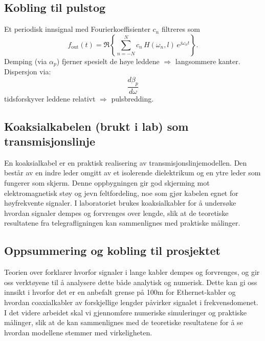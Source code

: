 \subsection{Kobling til pulstog}
Et periodisk innsignal med Fourierkoeffisienter \(c_n\) filtreres som
\[
f_{\text{out}}(t)=\Re\!\left\{\sum_{n=-N}^{N} c_n\,H(\omega_n,l)\,e^{j\omega_n t}\right\}.
\]
Demping (via \(\alpha_p\)) fjerner spesielt de høye leddene \(\Rightarrow\) langsommere kanter.\\
Dispersjon via: 
\[\frac{d\beta_p}{d\omega}\] 
tidsforskyver leddene relativt \(\Rightarrow\) pulsbredding.

\subsection{Koaksialkabelen (brukt i lab) som transmisjonslinje}
En koaksialkabel er en praktisk realisering av transmisjonslinjemodellen. Den består av en indre leder omgitt av et isolerende dielektrikum og en ytre leder som fungerer som skjerm. Denne oppbygningen gir god skjerming mot elektromagnetisk støy og jevn feltfordeling, noe som gjør kabelen egnet for høyfrekvente signaler. I laboratoriet brukes koaksialkabler for å undersøke hvordan signaler dempes og forvrenges over lengde, slik at de teoretiske resultatene fra telegrafligningen kan sammenlignes med praktiske målinger.

\subsection{Oppsummering og kobling til prosjektet}

Teorien over forklarer hvorfor signaler i lange kabler dempes og forvrenges, og gir oss verktøyene til å analysere dette både analytisk og numerisk. Dette kan gi oss innsikt i hvorfor det er en anbefalt grense på 100m for Ethernet-kabler og hvordan coaxialkabler av forskjellige lengder påvirker signalet i frekvensdomenet. I det videre arbeidet skal vi gjennomføre numeriske simuleringer og praktiske målinger, slik at de kan sammenlignes med de teoretiske resultatene for å se hvordan modellene stemmer med virkeligheten.
